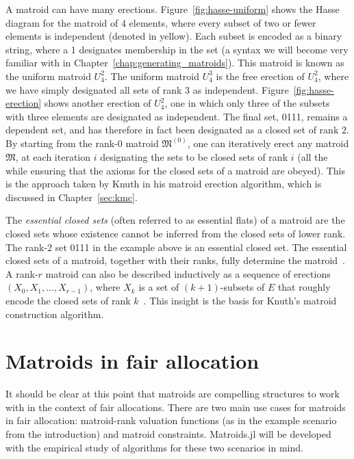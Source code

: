 A matroid can have many erections. Figure~\ref{fig:hasse-uniform} shows the Hasse diagram for the matroid of 4 elements, where every subset of two or fewer elements is independent (denoted in yellow). Each subset is encoded as a binary string, where a 1 designates membership in the set (a syntax we will become very familiar with in Chapter~\ref{chap:generating_matroids}). This matroid is known as the uniform matroid $U_4^2$. The uniform matroid $U_4^3$ is the free erection of $U_4^2$, where we have simply designated all sets of rank 3 as independent. Figure~\ref{fig:hasse-erection} shows another erection of $U_4^2$, one in which only three of the subsets with three elements are designated as independent. The final set, 0111, remains a dependent set, and has therefore in fact been designated as a closed set of rank $2$. By starting from the rank-0 matroid $\mathfrak{M}^{(0)}$, one can iteratively erect any matroid $\mathfrak{M}$, at each iteration $i$ designating the sets to be closed sets of rank $i$ (all the while ensuring that the axioms for the closed sets of a matroid are obeyed). This is the approach taken by Knuth in his matroid erection algorithm, which is discussed in Chapter~\ref{sec:kmc}.

The \textit{essential closed sets} (often referred to as essential flats) of a matroid are the closed sets whose existence cannot be inferred from the closed sets of lower rank. The rank-2 set 0111 in the example above is an essential closed set. The essential closed sets of a matroid, together with their ranks, fully determine the matroid~\cite{kelly-1978}. A rank-$r$ matroid can also be described inductively as a sequence of erections $(X_0, X_1, \dots, X_{r-1})$, where $X_k$ is a set of $(k+1)$-subsets of $E$ that roughly encode the closed sets of rank $k$~\cite{pendavingh2016enumerating}. This insight is the basis for Knuth's matroid construction algorithm.


\section{Matroids in fair allocation}
It should be clear at this point that matroids are compelling structures to work with in the context of fair allocations. There are two main use cases for matroids in fair allocation: matroid-rank valuation functions (as in the example scenario from the introduction) and matroid constraints. Matroids.jl will be developed with the empirical study of algorithms for these two scenarios in mind.

